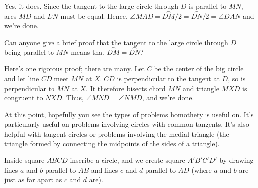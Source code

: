 
Yes, it does. Since the tangent to the large circle through $D$ is parallel to $MN$, arcs $MD$ and $DN$ must be equal. Hence, $\angle MAD = \overset{\frown}{DM}/2 = \overset{\frown}{DN}/2 = \angle DAN$ and we're done.

Can anyone give a brief proof that the tangent to the large circle through $D$ being parallel to $MN$ means that $\overset{\frown}{DM} = \overset{\frown}{DN}$?

Here's one rigorous proof; there are many. Let $C$ be the center of the big circle and let line $CD$ meet $MN$ at $X$. $CD$ is perpendicular to the tangent at $D$, so is perpendicular to $MN$ at $X$. It therefore bisects chord $MN$ and triangle $MXD$ is congruent to $NXD$. Thus, $\angle MND = \angle NMD$, and we're done.

At this point, hopefully you see the types of problems homothety is useful on. It's particularly useful on problems involving circles with common tangents. It's also helpful with tangent circles or problems involving the medial triangle (the triangle formed by connecting the midpoints of the sides of a triangle).

Inside square $ABCD$ inscribe a circle, and we create square $A'B'C'D'$ by drawing lines $a$ and $b$ parallel to $AB$ and lines $c$ and $d$ parallel to $AD$ (where $a$ and $b$ are just as far apart as $c$ and $d$ are).




